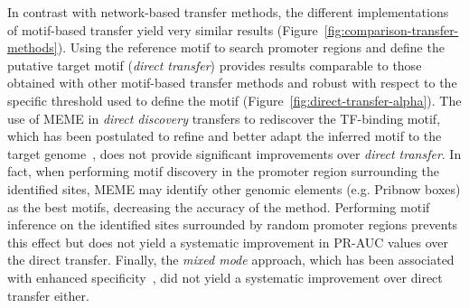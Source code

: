 In contrast with network-based transfer methods, the different implementations
of motif-based transfer yield very similar results
(Figure~\ref{fig:comparison-transfer-methods}). Using the reference motif to
search promoter regions and define the putative target motif (\textit{direct transfer})
provides results comparable to those obtained with other motif-based transfer
methods and robust with respect to the specific threshold used to define the
motif (Figure~\ref{fig:direct-transfer-alpha}). The use of MEME in \textit{direct
discovery} transfers to rediscover the TF-binding motif, which has been
postulated to refine and better adapt the inferred motif to the target
genome~\citep{habib2012functional}, does not provide significant improvements
over \textit{direct transfer}. In fact, when performing motif discovery in the
promoter region surrounding the identified sites, MEME may identify other
genomic elements (e.g. Pribnow boxes) as the best motifs, decreasing the
accuracy of the method. Performing motif inference on the identified sites
surrounded by random promoter regions prevents this effect but does not yield a
systematic improvement in PR-AUC values over the direct transfer. Finally, the
\textit{mixed mode} approach, which has been associated with enhanced
specificity~\citep{baumbach2010power, baumbach2009reliable}, did not yield a
systematic improvement over direct transfer either.

